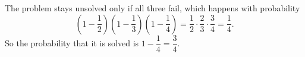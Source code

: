 The problem stays unsolved only if all three fail, which happens with probability
\[\left(1-\dfrac12\right)\left(1-\dfrac13\right)\left(1-\dfrac14\right)=\dfrac12\cdot\dfrac23\cdot\dfrac34=\dfrac14.\]
So the probability that it is solved is $1-\dfrac14=\boxed{\dfrac34}$.
